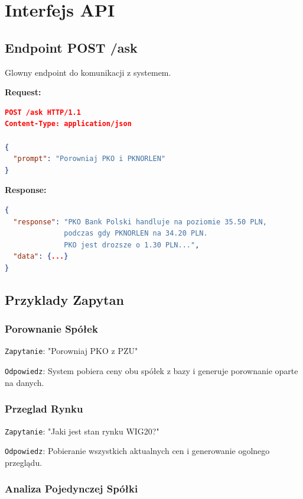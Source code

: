 \documentclass[11pt,a4paper]{article}
\begin{document}
\section{Interfejs API}

\subsection{Endpoint POST /ask}

Glowny endpoint do komunikacji z systemem.

\textbf{Request:}
\begin{lstlisting}[language=json]
POST /ask HTTP/1.1
Content-Type: application/json

{
  "prompt": "Porowniaj PKO i PKNORLEN"
}
\end{lstlisting}

\textbf{Response:}
\begin{lstlisting}[language=json]
{
  "response": "PKO Bank Polski handluje na poziomie 35.50 PLN, 
              podczas gdy PKNORLEN na 34.20 PLN. 
              PKO jest drozsze o 1.30 PLN...",
  "data": {...}
}
\end{lstlisting}

\subsection{Przyklady Zapytan}

\subsubsection{Porownanie Spółek}

\texttt{Zapytanie}: "Porowniaj PKO z PZU"

\texttt{Odpowiedz}: System pobiera ceny obu spółek z bazy i generuje porownanie oparte na danych.

\subsubsection{Przeglad Rynku}

\texttt{Zapytanie}: "Jaki jest stan rynku WIG20?"

\texttt{Odpowiedz}: Pobieranie wszystkich aktualnych cen i generowanie ogolnego przeglądu.

\subsubsection{Analiza Pojedynczej Spółki}
\end{document}
